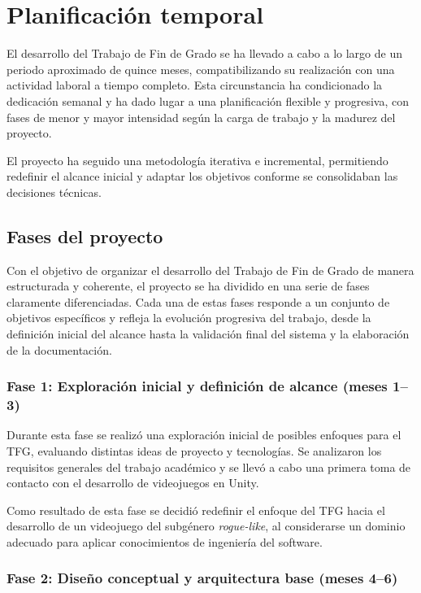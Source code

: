 \chapter{Planificación temporal}

El desarrollo del Trabajo de Fin de Grado se ha llevado a cabo a lo largo de un periodo aproximado de quince meses, compatibilizando su realización con una actividad laboral a tiempo completo. Esta circunstancia ha condicionado la dedicación semanal y ha dado lugar a una planificación flexible y progresiva, con fases de menor y mayor intensidad según la carga de trabajo y la madurez del proyecto.

El proyecto ha seguido una metodología iterativa e incremental, permitiendo redefinir el alcance inicial y adaptar los objetivos conforme se consolidaban las decisiones técnicas.

\section{Fases del proyecto}

Con el objetivo de organizar el desarrollo del Trabajo de Fin de Grado de manera estructurada y coherente, el proyecto se ha dividido en una serie de fases claramente diferenciadas. Cada una de estas fases responde a un conjunto de objetivos específicos y refleja la evolución progresiva del trabajo, desde la definición inicial del alcance hasta la validación final del sistema y la elaboración de la documentación.

\subsection{Fase 1: Exploración inicial y definición de alcance (meses 1--3)}

Durante esta fase se realizó una exploración inicial de posibles enfoques para el TFG, evaluando distintas ideas de proyecto y tecnologías. Se analizaron los requisitos generales del trabajo académico y se llevó a cabo una primera toma de contacto con el desarrollo de videojuegos en Unity.

Como resultado de esta fase se decidió redefinir el enfoque del TFG hacia el desarrollo de un videojuego del subgénero \textit{rogue-like}, al considerarse un dominio adecuado para aplicar conocimientos de ingeniería del software.

\subsection{Fase 2: Diseño conceptual y arquitectura base (meses 4--6)}


